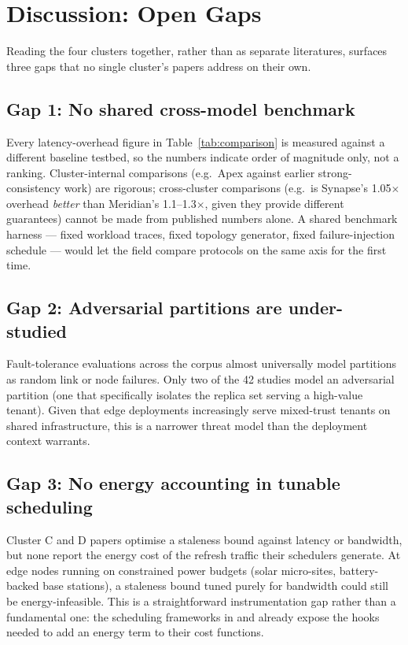 \section{Discussion: Open Gaps}
\label{sec:discussion}

Reading the four clusters together, rather than as separate literatures, surfaces three gaps that no
single cluster's papers address on their own.

\subsection{Gap 1: No shared cross-model benchmark}

Every latency-overhead figure in Table~\ref{tab:comparison} is measured against a different baseline
testbed, so the numbers indicate order of magnitude only, not a ranking. Cluster-internal comparisons
(e.g.\ Apex against earlier strong-consistency work) are rigorous; cross-cluster comparisons (e.g.\ is
Synapse's 1.05$\times$ overhead \emph{better} than Meridian's 1.1--1.3$\times$, given they provide
different guarantees) cannot be made from published numbers alone. A shared benchmark harness --- fixed
workload traces, fixed topology generator, fixed failure-injection schedule --- would let the field
compare protocols on the same axis for the first time.

\subsection{Gap 2: Adversarial partitions are under-studied}

Fault-tolerance evaluations across the corpus almost universally model partitions as random link or
node failures. Only two of the 42 studies model an adversarial partition (one that specifically
isolates the replica set serving a high-value tenant). Given that edge deployments increasingly serve
mixed-trust tenants on shared infrastructure, this is a narrower threat model than the deployment
context warrants.

\subsection{Gap 3: No energy accounting in tunable scheduling}

Cluster C and D papers optimise a staleness bound against latency or bandwidth, but none report the
energy cost of the refresh traffic their schedulers generate. At edge nodes running on constrained
power budgets (solar micro-sites, battery-backed base stations), a staleness bound tuned purely for
bandwidth could still be energy-infeasible. This is a straightforward instrumentation gap rather than a
fundamental one: the scheduling frameworks in \citet{osei2019vertex} and \citet{nakamura2023meridian}
already expose the hooks needed to add an energy term to their cost functions.


